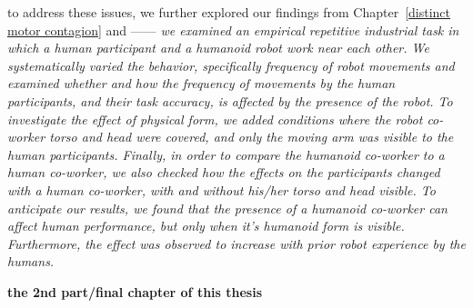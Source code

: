 to address these issues, we further explored our findings from Chapter~\ref{distinct motor contagion} and  ------
\textit{we examined an empirical repetitive industrial task in which a human participant and a humanoid robot work near each other. We systematically varied the behavior, specifically frequency of robot movements and examined whether and how the frequency of movements by the human participants, and their task accuracy, is affected by the presence of the robot. To investigate the effect of physical form, we added conditions where the robot co-worker torso and head were covered, and only the moving arm was visible to the human participants. Finally, in order to compare the humanoid co-worker to a human co-worker, we also checked how the effects on the participants changed with a human co-worker, with and without his/her torso and head visible. To anticipate our results, we found that the presence of a humanoid co-worker can affect human performance, but only when it's humanoid form is visible. Furthermore, the effect was observed to increase with prior robot experience by the humans.}



\textbf{the 2nd part/final chapter of this thesis}

\clearpage %
\pagestyle{fancy}

